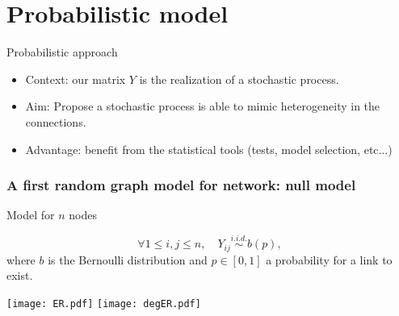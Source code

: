 \documentclass[compress,10pt]{beamer}
\begin{document}




\section{Probabilistic  model}
\begin{frame}{Probabilistic approach}
\begin{itemize}
\item 
\alert{Context}: our   matrix $Y$ is the realization of a stochastic process.
\item 
\alert{Aim}: Propose a  stochastic process is able to mimic heterogeneity in the connections.  
\item \alert{Advantage}: benefit from the statistical tools (tests,  model selection, etc...)  
\end{itemize}

\end{frame}



\begin{frame}\frametitle{A first random graph model for network: null model}


\cite{erdos59a} Model for $n$ nodes 

$$\forall 1\le i,j\le n,\quad Y_{ij}\overset{i.i.d.}{\sim} b(p),$$
where $b$ is the Bernoulli distribution and $p\in[0,1]$ a probability for a link to exist. 


\begin{center}
 \texttt{[image: ER.pdf]} \texttt{[image: degER.pdf]}
\end{center}


\end{frame}
\end{document}
